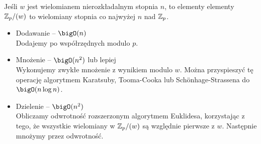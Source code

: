 Jeśli \( w \) jest wielomianem nierozkładalnym stopnia \( n \), to elementy 
elementy \( \mathbb{Z}_p/(w) \) to wielomiany stopnia co najwyżej \( n \) nad \( \mathbb{Z}_p \).
\begin{itemize}
    \item Dodawanie -- \( \bigO(n) \) \\
    Dodajemy po współrzędnych modulo \( p \).
    \item Mnożenie -- \( \bigO(n^2) \) lub lepiej \\
    Wykonujemy zwykłe mnożenie z wynikiem modulo \( w \). Można przyspieszyć tę operację algorytmem Karatsuby, Tooma-Cooka lub Sch\"onhage-Strassena do \( \bigO(n\log n) \).
    \item Dzielenie -- \( \bigO(n^2) \) \\
    Obliczamy odwrotność rozszerzonym algorytmem Euklidesa, korzystając z tego, że wszystkie wielomiany w \( \mathbb{Z}_p/(w) \) są względnie pierwsze z \( w \). Następnie mnożymy przez odwrotność.
\end{itemize}
